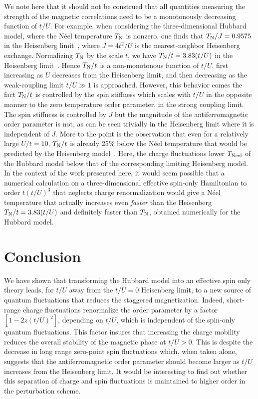 \documentclass[aps,prb,twocolumn,superscriptaddress,
               amsmath]{revtex4}
\renewcommand{\=}{\,=\,}
\newcommand{\+}{\,+\,}
\renewcommand{\-}{\,-\,}
\begin{document}
We note here that it should not be construed that all quantities
measuring the strength of the magnetic correlations need to be a
monotonously decreasing function of $t/U$. For example, when
considering the three-dimensional Hubbard model, where
the N\'eel temperature $T_{\rm N}$ is nonzero, one finds
that $T_{\rm N}/J =0.9575$ in the Heisenberg limit~\cite{Staudt},
where $J=4t^2/U$ is
the nearest-neighbor Heisenberg exchange. Normalizing
$T_{\rm N}$ by the scale $t$,  we have
$T_{\rm N}/t=3.83 (t/U)$ in the Heisenberg limit~\cite{Staudt,Note_finite_T}.
Hence $T_{\rm N}/t$ is a non-monotonous function of $t/U$, first increasing
as $U$ decreases from the Heisenberg limit, and then decreasing as the weak-coupling limit $t/U \gg 1$ is approached. However, this behavior comes the fact $T_{\rm N}/t$ is controlled by the spin stiffness which scales with $t/U$ in the opposite manner to the zero temperature order parameter, in the strong coupling limit. The spin stiffness is controlled by $J$ but the magnitude of the antiferromagnetic order parameter is not, as can be seen trivially in the Heisenberg limit where it is independent of $J$. More to the point is the observation that
even for a relatively large $U/t=10$,
 $T_{\rm N}/t$
is already 25$\%$ below the N\'eel temperature that would
be predicted by the Heisenberg model~\cite{Staudt}.
Here, the charge fluctuations lower $T_{\rm Neel}$ of the Hubbard model
below that of the corresponding limiting Heisenberg model.
In the context of the work presented here,
it would seem possible
that a numerical calculation on a three-dimensional effective
spin-only Hamiltonian to order $t(t/U)^3$ that neglects charge renormalization
would give a
N\'eel temperature that actually increases even {\it faster}
than the Heisenberg $T_{\rm N}/t=3.83(t/U)$ and definitely faster than $T_{\rm N}$, obtained numerically for the Hubbard model.



\section{Conclusion}

We have shown that transforming the Hubbard model
into an effective spin only theory leads, 
for $t/U$ away from the $t/U=0$ Heisenberg limit,
to a new source of quantum fluctuations that
reduces the staggered magnetization. Indeed, short-range charge
fluctuations renormalize the order parameter by a factor $[1-2z(t/U)^2]$,
depending on $t/U$, which is independent of the spin-only quantum
fluctuations. This factor insures that increasing the charge
mobility reduces the overall stability of the magnetic phase
at $t/U>0$. This is despite the
decrease in long range zero-point spin fluctuations which, when taken alone,
suggests that the antiferromagnetic order parameter should become 
larger as $t/U$ increases from the Heisenberg limit. It would be interesting to 
find out whether this separation of charge and spin
fluctuations is maintained to higher order in the perturbation
scheme.
\end{document}
